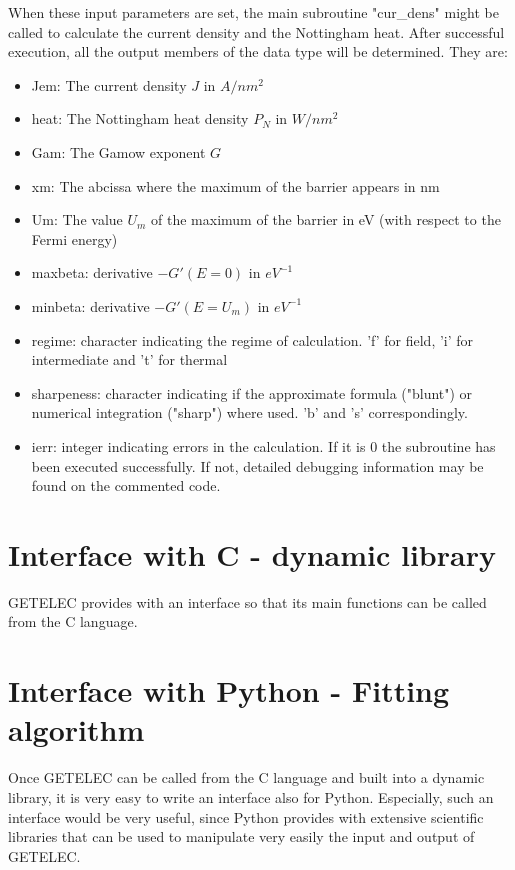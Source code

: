 \documentclass[notitlepage
]{revtex4-1}
\begin{document}
When these input parameters are set, the main subroutine "cur\_dens" might be called to calculate the current density and the Nottingham heat. After successful execution, all the output members of the data type will be determined. They are:
\begin{itemize}
	\item Jem: The current density $J$ in $A/nm^2$
	\item heat: The Nottingham heat density $P_N$ in $W/nm^2$
	\item Gam: The Gamow exponent $G$
	\item xm: The abcissa where the maximum of the barrier appears in nm
	\item Um: The value $U_m$ of the maximum of the barrier in eV (with respect to the Fermi energy)
	\item maxbeta: derivative $-G'( E = 0)$ in $eV^{-1}$
	\item minbeta: derivative $-G'( E = U_m)$ in $eV^{-1}$
	\item regime: character indicating the regime of calculation. 'f' for field, 'i' for intermediate and 't' for thermal
	\item sharpeness: character indicating if the approximate formula ("blunt") or numerical integration ("sharp") where used. 'b' and 's' correspondingly.
	\item ierr: integer indicating errors in the calculation. If it is 0 the subroutine has been executed successfully. If not, detailed debugging information may be found on the commented code.    
\end{itemize} 


\section{Interface with C - dynamic library}
\label{sec:C}

GETELEC provides with an interface so that its main functions can be called from the C language.


\section{Interface with Python - Fitting algorithm}
\label{sec:Python}

Once GETELEC can be called from the C language and built into a dynamic library, it is very easy to write an interface also for Python. Especially, such an interface would be very useful, since Python provides with extensive scientific libraries that can be used to manipulate very easily the input and output of GETELEC.



%
\end{document}
